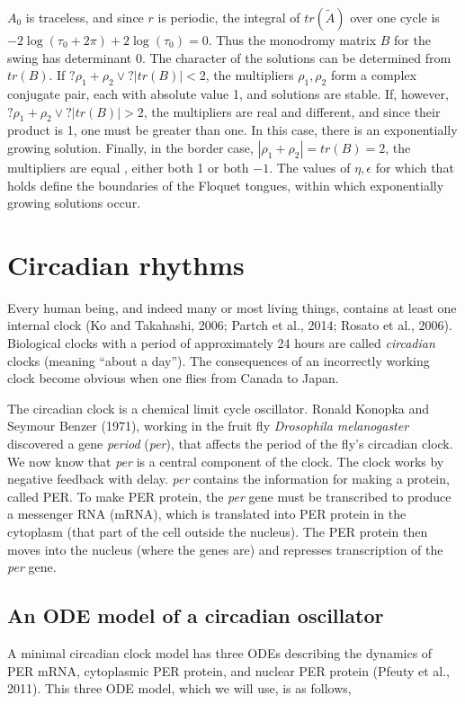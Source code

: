 \documentclass[letterpaper]{article}
\begin{document}
 ${A}_{0}$ is traceless, and since  $r$ is periodic, the integral of 
$\mathit{tr}(\widetilde{{A}})$ over one cycle is  $-2\log \left({\tau
}_{0}+2\pi \right)+2\log \left({\tau }_{0}\right)=0$. Thus the
monodromy matrix  $B$ for the swing has determinant 0. The character
of the solutions can be determined from  $\mathit{tr}\left(B\right)$.
If  $?{\rho }_{1}+{\rho }_{2}\vee
?\left|\mathit{tr}\left(B\right)\right|<2$, the multipliers  ${\rho
}_{1},{\rho }_{2}$ form a complex conjugate pair, each with absolute
value 1, and solutions are stable. If, however,  $?{\rho }_{1}+{\rho
}_{2}\vee ?\left|\mathit{tr}\left(B\right)\right|>2$, the multipliers
are real and different, and since their product is 1, one must be
greater than one. In this case, there is an exponentially growing
solution. Finally, in the border case,  $\left|{\rho }_{1}+{\rho
}_{2}\right|=\mathit{tr}\left(B\right)=2$, the multipliers are equal
, either both 1 or both  $-1$. The values of  $\eta ,\epsilon $ for
which that holds define the boundaries of the Floquet tongues, within
which exponentially growing solutions occur. 

\section[Circadian rhythms]{Circadian rhythms}
Every human being, and indeed many or most living things, contains at
least one internal clock (Ko and Takahashi, 2006; Partch et al.,
2014; Rosato et al., 2006). Biological clocks with a period of
approximately 24 hours are called \textit{circadian} clocks (meaning
“about a day”). The consequences of an incorrectly working clock
become obvious when one flies from Canada to Japan.

The circadian clock is a chemical limit cycle oscillator. Ronald
Konopka and Seymour Benzer (1971), working in the fruit fly
\textit{Drosophila melanogaster} discovered a gene \textit{period}
(\textit{per}), that affects the period of the fly’s circadian clock.
We now know that \textit{per} is a central component of the clock.
The clock works by negative feedback with delay. \textit{per}
contains the information for making a protein, called PER. To make
PER protein, the \textit{per} gene must be transcribed to produce a
messenger RNA (mRNA), which is translated into PER protein in the
cytoplasm (that part of the cell outside the nucleus). The PER
protein then moves into the nucleus (where the genes are) and
represses transcription of the \textit{per} gene. 

\subsection{An ODE model of a circadian oscillator}
A minimal circadian clock model has three ODEs describing the dynamics
of PER mRNA, cytoplasmic PER protein, and nuclear PER protein (Pfeuty
et al., 2011). This three ODE model, which we will use, is as
follows,
\end{document}
